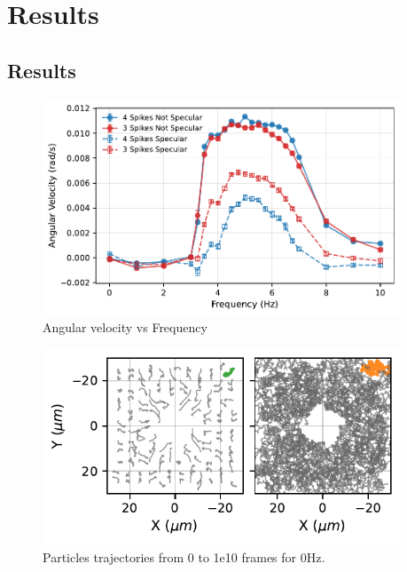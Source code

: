 \part{Results}
\label{part:results}

\chapter{Results}

\begin{figure}
  \begin{center}
    \includegraphics[width=0.95\textwidth]{figures/AvsF.pdf}
  \end{center}
  \caption[Angular velocity graph.]{Angular velocity vs Frequency}\label{fig:angularvsfrequency}
\end{figure}

\begin{figure}
  \begin{center}
    \includegraphics[width=0.95\textwidth]{figures/parttrj.pdf}
  \end{center}
  \caption[Particles trajectories]{Particles trajectories from 0 to 1e10 frames for 0Hz.}\label{fig:particletrj}
\end{figure}

